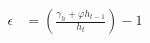   \begin{align}
    \epsilon &= \left( \frac{\gamma_h + \varphi h_{t-1}}{h_t} \right) -1 \label{eq:epsilon_elast}
  \end{align}
